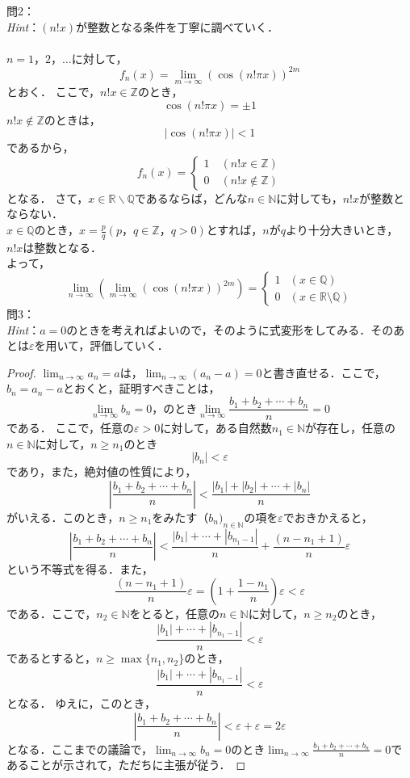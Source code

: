 \documentclass[dvipdfmx,uplatex,11pt]{jsarticle}
\theoremstyle{definition}
\begin{document}
\newpage
\noindent
問2：
\\
\textsl{Hint}：$(n!x)$が整数となる条件を丁寧に調べていく．\\
\dotfill
%
% 
%
\\
$n=1，2，\ldots$に対して，
\[
	f_{n} (x)=\lim_{m \to \infty} (\cos (n! \pi x)) ^{2m}
\]
とおく．
ここで，$n!x \in \mathbb{Z}$のとき，
\[
	\cos (n! \pi x)=\pm 1
\]
$n!x \notin \mathbb{Z}$のときは，
\[
	|\cos (n! \pi x)|<1
\]
であるから，
\[
	f_{n} (x)=
	\begin{cases}
		1 \quad(n!x \in \mathbb{Z}) \\
		0 \quad (n!x \notin \mathbb{Z})
	\end{cases}
\]
となる．
さて，$x \in \mathbb{R} \backslash\mathbb{Q}$であるならば，どんな$n \in \mathbb{N}$に対しても，$n! x$が整数とならない．\\
$x \in \mathbb{Q}$のとき，$ x=\frac{p}{q}(p，q \in \mathbb{Z}，q>0)$とすれば，$n$が$q$より十分大きいとき，$n!x$は整数となる．\\
よって，
\[
	\lim_{n \to \infty} \left( \lim_{m \to \infty} (\cos (n! \pi x)) ^{2m} \right)=
	\begin{cases}
		1 &(x \in \mathbb{Q}) \\
		0 & (x \in \mathbb{R} \setminus \mathbb{Q})
	\end{cases}
\]
%
\newpage
%
\noindent
問3：
\\
\textsl{Hint}：$a=0$のときを考えればよいので，そのように式変形をしてみる．そのあとは$\varepsilon$を用いて，評価していく．\\
\dotfill
%
\begin{leftbar}
	\begin{proof}
		$\lim_{n \to \infty} a_n= a$は，$ \lim_{n \to \infty} (a_n - a)= 0$と書き直せる．ここで，$b_n = a_n -a$とおくと，証明すべきことは，
		\[
			\lim_{n \to \infty} b_n=0，\text{のとき} \lim_{n \to \infty} \frac{b_1 + b_2 + \cdots +b_n}{n} = 0
		\]
		である．
		ここで，任意の$\varepsilon > 0$に対して，ある自然数$n_1 \in \mathbb{N}$が存在し，任意の$n \in \mathbb{N}$に対して，$n \ge n_1$のとき
		\[
			|b_n|<\varepsilon
		\]
		であり，また，絶対値の性質により，
		\[
			\left| \frac{b_1 + b_2 + \cdots +b_n}{n} \right| <\frac{|b_1| + |b_2| + \cdots +|b_n|}{n}
		\]
		がいえる．このとき，$n \ge n_1$をみたす$（b_n)_{n \in \mathbb{N}}$の項を$\varepsilon$でおきかえると，
		\[
			\left| \frac{b_1 + b_2 + \cdots +b_n}{n} \right| < \frac{|b_1|+ \cdots + |b_{n_1-1}|}{n} +\frac{(n-n_1 +1)}{n} \varepsilon
		\]
		という不等式を得る．また，
		\[
			\frac{(n-n_1 +1)}{n} \varepsilon = \left(1+\frac{1-n_1}{n}\right)\varepsilon <\varepsilon
		\]
		である．ここで，$n_2 \in \mathbb{N}$をとると，任意の$n \in \mathbb{N}$に対して，$n \ge n_2$のとき，
		\[
			\frac{|b_1|+ \cdots + |b_{n_1-1}|}{n} <\varepsilon
		\]
		であるとすると，$n \ge \max \{ n_1,n_2\}$のとき，
		\[
			\frac{|b_1|+ \cdots + |b_{n_1-1}|}{n} < \varepsilon
		\]
		となる．
		ゆえに，このとき，
		\[
			\left| \frac{ b_1 + b_2 + \cdots +b_n}{n} \right|　< \varepsilon+\varepsilon=2\varepsilon
		\]
		となる．ここまでの議論で，$\lim_{n \to \infty} b_n =0$のとき$\lim_{n \to \infty} \frac{ b_1 + b_2 + \cdots +b_n}{n} =0$であることが示されて，ただちに主張が従う．
	\end{proof}
\end{leftbar}
\end{document}
